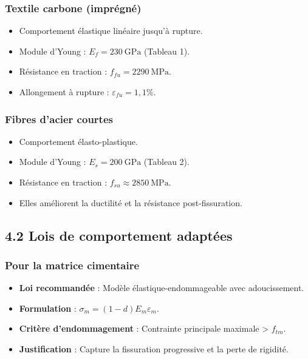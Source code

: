 \documentclass{rapportECL}
\begin{document}
\subsubsection*{Textile carbone (imprégné)}
\begin{itemize}
    \item Comportement élastique linéaire jusqu'à rupture.
    \item Module d'Young : $E_f = 230\ \text{GPa}$ (Tableau 1).
    \item Résistance en traction : $f_{fu} = 2290\ \text{MPa}$.
    \item Allongement à rupture : $\varepsilon_{fu} = 1,1\%$.
\end{itemize}

\subsubsection*{Fibres d'acier courtes}
\begin{itemize}
    \item Comportement élasto-plastique.
    \item Module d'Young : $E_s = 200\ \text{GPa}$ (Tableau 2).
    \item Résistance en traction : $f_{su} \approx 2850\ \text{MPa}$.
    \item Elles améliorent la ductilité et la résistance post-fissuration.
\end{itemize}

\subsection*{4.2 Lois de comportement adaptées}
\subsubsection*{Pour la matrice cimentaire}
\begin{itemize}
    \item \textbf{Loi recommandée} : Modèle élastique-endommageable avec adoucissement.
    \item \textbf{Formulation} : $\sigma_m = (1 - d)E_m\varepsilon_m$.
    \item \textbf{Critère d'endommagement} : Contrainte principale maximale > $f_{tm}$.
    \item \textbf{Justification} : Capture la fissuration progressive et la perte de rigidité.
\end{itemize}
\end{document}
